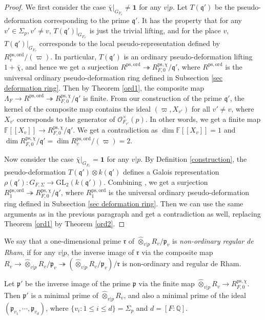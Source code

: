 \documentclass[a4paper, 12pt]{amsart}
\def\ps{\mathrm{ps}}
\def\ord{\mathrm{ord}}
\newcommand{\F}{\mathbb{F}}
\newcommand{\Q}{\mathbb{Q}}
\newcommand{\GL}{\mathrm{GL}}
\newcommand{\cO}{\mathcal{O}}
\newcommand{\kq}{\mathfrak{q}}
\newcommand{\kp}{\mathfrak{p}}
\begin{document}
\begin{proof}
    	We first consider the case $\bar{\chi}|_{G_{F_v}} \ne \mathbf{1}$ for any $v|p$. Let $T(\kq')$ be the pseudo-deformation corresponding to the prime $\kq'$. It has the property that for any $v' \in \Sigma_p, v' \ne v$, $T(\kq')|_{G_{F_{v'}}} $ is just the trivial lifting, and for the place $v$, $T(\kq')|_{G_{F_{v}}} $ corresponds to the local pseudo-representation defined by $ R_v^{\ps, \ord}/(\varpi)$. In particular, $T(\kq')$ is an ordinary pseudo-deformation lifting $1+\bar{\chi}$, and hence we get a surjection $R^{\ps, \ord} \twoheadrightarrow R_{F, 0}^{\ps, \chi}/\kq'$, where $R^{\ps, \ord}$ is the universal ordinary pseudo-deformation ring defined in Subsection \ref{sec deformation ring}. Then by Theorem \ref{ord1}, the composite map $\Lambda_F \to R^{\ps, \ord} \twoheadrightarrow R_{F, 0}^{\ps, \chi}/\kq'$ is finite. From our construction of the prime $\kq'$, the kernel of the composite map contains the ideal $(\varpi, X_{v'})$ for all $v' \ne v$, where $X_{v'} $ corresponds to the generator of $\cO_{F_{v'}}^\times(p)$. In other words, we get a finite map $\F[[X_v]] \to R_{F, 0}^{\ps, \chi}/\kq'$. We get a contradiction as $\dim \F[[X_v]] =1$ and $\dim R_{F, 0}^{\ps, \chi}/\kq' =\dim R_v^{\ps, \ord}/(\varpi) =2$.
    	
    	Now consider the case $\bar{\chi}|_{G_{F_v}} = \mathbf{1}$ for any $v|p$. By Definition \ref{construction}, the pseudo-deformation $T(\kq') \otimes k(\kq')$ defines a Galois representation $\rho(\kq') : G_{F, \Sigma} \to \GL_2(k(\kq'))$. Combining \cite[Lemma 5.3.2]{pan2022fontaine}, we get a surjection $R_1^{\ps, \ord} \twoheadrightarrow R_{F, 0}^{\ps, \chi}/\kq'$, where $R_1^{\ps, \ord}$ is the universal ordinary pseudo-deformation ring defined in Subsection \ref{sec deformation ring}. Then we can use the same arguments as in the previous paragraph and get a contradiction as well, replacing Theorem \ref{ord1} by Theorem \ref{ord2}.
    \end{proof}
    
    We say that a one-dimensional prime $\mathfrak{r}$ of $\widehat{\otimes}_{v |p} R_{v}/\kp_v$ is \textit{non-ordinary regular de Rham}, if for any $v|p$, the inverse image of $\mathfrak{r}$ via the composite map $R_v \to \widehat{\otimes}_{v |p} R_{v}/\kp_v \twoheadrightarrow (\widehat{\otimes}_{v |p} R_{v}/\kp_v)/\mathfrak{r}$ is non-ordinary and regular de Rham.
    
    Let $\kp'$ be the inverse image of the prime $\kp$ via the finite map $\widehat{\otimes}_{v |p} R_{v} \to R_{F, 0}^{\ps, \chi}$. Then $\kp'$ is a minimal prime of $\widehat{\otimes}_{v |p} R_{v}$, and also a minimal prime of the ideal $(\kp_{v_1}, \cdots, \kp_{v_d})$, where $\{v_i: 1 \le i \le d \} = \Sigma_p$ and $d=[F: \Q]$.
    
\end{document}
